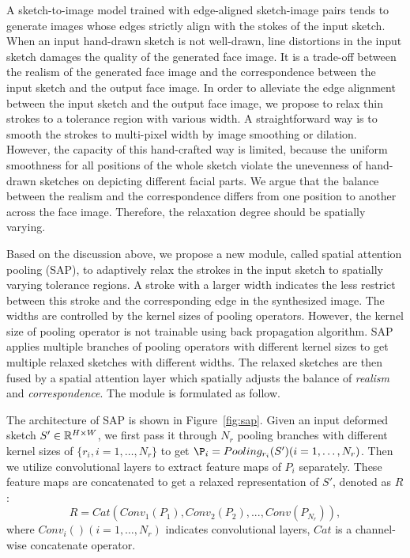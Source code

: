 
 
A sketch-to-image model trained with edge-aligned sketch-image pairs tends to generate images whose edges strictly align with the stokes of the input sketch.
When an input hand-drawn sketch is not well-drawn, line distortions in the input sketch damages the quality of the generated face image. 
It is a trade-off between the realism of the generated face image and the correspondence between the input sketch and the output face image.
%
In order to alleviate the edge alignment between the input sketch and the output face image, we propose to relax thin strokes to a tolerance region with various width.
%
A straightforward way is to smooth the strokes to multi-pixel width by image smoothing or dilation. 
%
However, the capacity of this hand-crafted way is limited, because the uniform smoothness for all positions of the whole sketch violate the unevenness of hand-drawn sketches on depicting different facial parts. 
%
We argue that the balance between the realism and the correspondence differs from one position to another across the face image. Therefore, the relaxation degree should be spatially varying. 


Based on the discussion above, we propose a new module, called spatial attention pooling (SAP), to adaptively relax the strokes in the input sketch to spatially varying tolerance regions. 
%
A stroke with a larger width indicates the less restrict between this stroke and the corresponding edge in the synthesized image. The widths are controlled by the kernel sizes of pooling operators. However, the kernel size of pooling operator is not trainable using back propagation algorithm. SAP applies multiple branches of pooling operators with different kernel sizes to get multiple relaxed sketches with different widths. The relaxed sketches are then fused by a spatial attention layer which spatially adjusts the balance of \textit{realism} and \textit{correspondence}. The module is formulated as follow.

The architecture of SAP is shown in Figure~\ref{fig:sap}.
Given an input deformed sketch $S'\in {\mathbb{R}}^{H\times W}$, we first pass it through $N_r$ pooling branches with different kernel sizes of $\{r_i, i=1,\ldots, N_r\}$ to get $\P_{i}=Pooling_{r_i}(S') (i=1,\ldots,N_r)$. 
Then we utilize convolutional layers to extract feature maps of $P_i$ separately. These feature maps are concatenated to get a relaxed representation of $S'$, denoted as $R$:
%
\begin{equation}
R=Cat(Conv_1(P_1), Conv_2(P_2),..., Conv(P_{N_r})),
\end{equation}
where $Conv_i() (i=1,\ldots,N_r)$ indicates convolutional layers, $Cat$ is a channel-wise concatenate operator.

